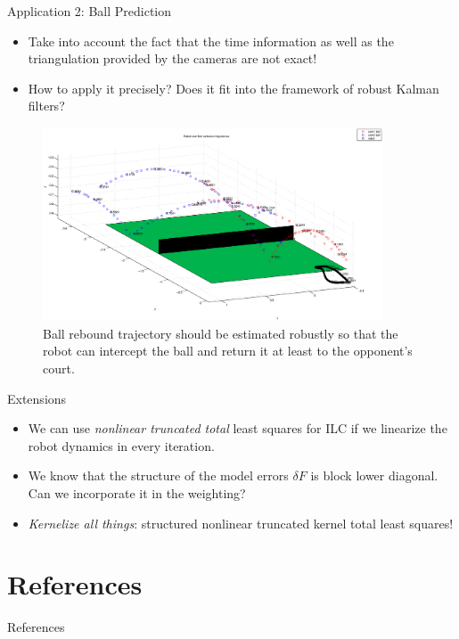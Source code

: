 \documentclass[handout]{beamer}
\begin{document}
%
\begin{frame}{Application 2: Ball Prediction}
\begin{itemize}
\item Take into account the fact that the time information as well as the triangulation provided by the cameras are not exact!
\item How to apply it precisely? Does it fit into the framework of robust Kalman filters?
\end{itemize}
\begin{figure}
\centering
\includegraphics[width=0.9\textwidth]{ballPrediction.eps}%
\caption{Ball rebound trajectory should be estimated robustly so that the robot can intercept the ball and return it at least to the opponent's court.}
\end{figure}
\end{frame}
%
\begin{frame}{Extensions}
\begin{itemize}
\item We can use \emph{nonlinear truncated total} least squares for ILC if we linearize the robot dynamics in every iteration.
\item We know that the structure of the model errors $\delta F$ is block lower diagonal. Can we incorporate it in the weighting? 
\item \emph{Kernelize all things}: structured nonlinear truncated kernel total least squares!
\end{itemize}
\end{frame}

\section{References}
\begin{frame}[allowframebreaks]{References}
\nocite{*}
\def\newblock{\hskip .11em plus .33em minus .07em}

\end{frame}
%
\end{document}
